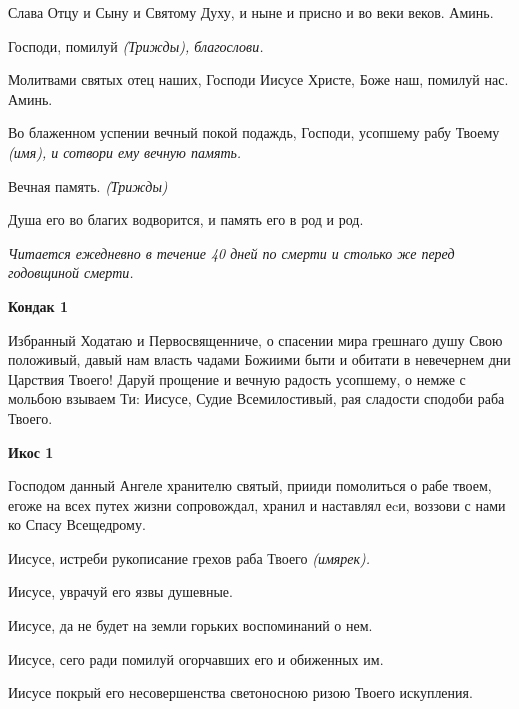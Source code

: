    Слава Отцу и Сыну и Святому Духу, и ныне и присно и во веки веков.
Аминь.



   Господи, помилуй \itshape (Трижды)\normalfont{}, благослови.



   Молитвами святых отец наших, Господи Иисусе Христе, Боже наш,
помилуй нас. Аминь.



   Во блаженном успении вечный покой подаждь, Господи, усопшему рабу
Твоему \itshape (имя)\normalfont{}, и сотвори ему вечную память.



   Вечная память. \itshape (Трижды)\normalfont{}



   Душа его во благих водворится, и память его в род и род.

   

\mychapterending




\itshape Читается ежедневно в течение 40 дней по смерти и столько же перед годовщиной смерти.\normalfont{} 




\bfseries Кондак 1 \normalfont{}


Избранный Ходатаю и Первосвященниче, о спасении мира грешнаго душу Свою положивый, давый нам власть чадами Божиими быти и обитати в невечернем дни Царствия Твоего! Даруй прощение и вечную радость усопшему, о немже с мольбою взываем Ти: Иисусе, Судие Всемилостивый, рая сладости сподоби раба Твоего.




\bfseries Икос 1\normalfont{}


Господом данный Ангеле хранителю святый, прииди помолиться о рабе твоем, егоже на всех путех жизни сопровождал, хранил и наставлял еcи, воззови с нами ко Спасу Всещедрому. 


Иисусе, истреби рукописание грехов раба Твоего \itshape (имярек)\normalfont{}. 


Иисусе, уврачуй его язвы душевные. 


Иисусе, да не будет на земли горьких воспоминаний о нем. 


Иисусе, сего ради помилуй огорчавших его и обиженных им. 


Иисусе покрый его несовершенства светоносною ризою Твоего искупления. 


